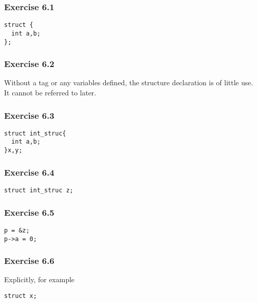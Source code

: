   

  \subsubsection*{Exercise 6.1}

   \begin{Verbatim}
struct {
  int a,b;
};
\end{Verbatim}

  

  \subsubsection*{Exercise 6.2}

   Without a tag or any variables defined, the structure declaration is of
    little use. It cannot be referred to later.


  

  \subsubsection*{Exercise 6.3}

   \begin{Verbatim}
struct int_struc{
  int a,b;
}x,y;
\end{Verbatim}

  

  \subsubsection*{Exercise 6.4}

   \begin{Verbatim}
struct int_struc z;
\end{Verbatim}

  

  \subsubsection*{Exercise 6.5}

   \begin{Verbatim}
p = &z;
p->a = 0;
\end{Verbatim}

  

  \subsubsection*{Exercise 6.6}

   Explicitly, for example


   \begin{Verbatim}
struct x;
\end{Verbatim}

